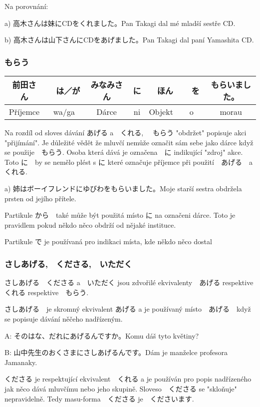 Na porovnání:

a) 高木さんは妹にCDをくれました。Pan Takagi dal mé mladší sestře CD.

b) 高木さんは山下さんにCDをあげました。Pan Takagi dal paní Yamashita CD.



\subsubsection{もらう}
\begin{center}
\begin{tabular}{||c|c||c|c||c|c||c||}
\hline
前田さん&　は／が　&みなみさん　&に&　ほん&　を　&もらいました。\\
\hline
Příjemce&wa/ga&Dárce&ni&Objekt&o&morau\\
\hline
\end{tabular}
\end{center}


Na rozdíl od sloves dávání あげる a　くれる, 　もらう "obdržet" popisuje akci "přijímání". Je důležité vědět že mluvčí nemůže označit sám sebe jako dárce když se použije　もらう. Osoba která dává je označena　に indikující "zdroj" akce.　Toto に　by se nemělo plést s に které označuje příjemce při použití　あげる　a くれる.


a) 姉はボーイフレンドにゆびわをもらいました。Moje starší sestra obdržela prsten od jejího přítele.

Partikule から　také může být použitá místo に na označeni dárce. Toto je pravidlem pokud někdo něco obdrží od nějaké instituce.

Partikule で je používaná pro indikaci místa, kde někdo něco dostal

\subsubsection{さしあげる,　くださる,　いただく}

さしあげる　くださる a　いただく jsou zdvořilé ekvivalenty　あげる respektive　くれる respektive　もらう. 

さしあげる　je skromný ekvivalent あげる a je používaný místo　あげる　když se popisuje dávání něčeho nadřízeným.

A: そのはな、だれにあげるんですか。Komu dáš tyto květiny?

B: 山中先生のおくさまにさしあげるんです。Dám je manželce profesora Jamanaky.

くださる je respektující ekvivalent　くれる a je používán pro popis nadřízeného jak něco dává mluvčímu nebo jeho skupině. Sloveso　くださる se "skloňuje" nepravidelně. Tedy masu-forma　くださる je　くださいます.

